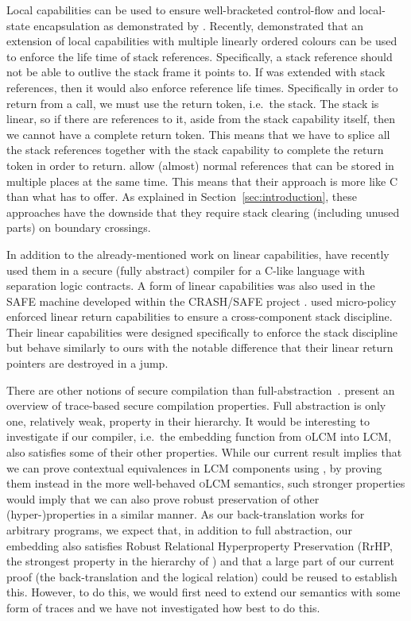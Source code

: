 \documentclass[acmsmall,screen]{acmart}\settopmatter{}
\newcommand{\trgcm}{\textsc{LCM}}
\newcommand{\srccm}{\textsc{oLCM}}
\begin{document}
Local capabilities can be used to ensure well-bracketed control-flow and local-state encapsulation as demonstrated by \citet{skorstengaard_reasoning_2017}.
Recently, \citet{tsampas_2019} demonstrated that an extension of local capabilities with multiple linearly ordered colours can be used to enforce the life time of stack references.
Specifically, a stack reference should not be able to outlive the stack frame it points to.
If \stktokens{} was extended with stack references, then it would also enforce reference life times.
Specifically in order to return from a call, we must use the return token, i.e.\ the stack.
The stack is linear, so if there are references to it, aside from the stack capability itself, then we cannot have a complete return token.
This means that we have to splice all the stack references together with the stack capability to complete the return token in order to return.
\citet{tsampas_2019} allow (almost) normal references that can be stored in multiple places at the same time.
This means that their approach is more like C than what \stktokens{} has to offer.
As explained in Section~\ref{sec:introduction}, these approaches have the downside that they require stack clearing (including unused parts) on boundary crossings.

In addition to the already-mentioned work on linear capabilities, \citet{van_strydonck_linear_2019} have recently used them in a secure (fully abstract) compiler for a C-like language with separation logic contracts.
A form of linear capabilities was also used in the SAFE machine developed within the CRASH/SAFE project \citep{DBLP:conf/sp/AmorimDGHPST15,DBLP:journals/jcs/AmorimCDDHPPPT16}.
\citet{Abate:2018:GCG:3243734.3243745} used micro-policy enforced linear return capabilities to ensure a cross-component stack discipline.
Their linear capabilities were designed specifically to enforce the stack discipline but behave similarly to ours with the notable difference that their linear return pointers are destroyed in a jump.

There are other notions of secure compilation than full-abstraction~\citep{abadi_protection_1998}.
\citet{abate_2019} present an overview of trace-based secure compilation properties.
Full abstraction is only one, relatively weak, property in their hierarchy.
It would be interesting to investigate if our compiler, i.e.\ the embedding function from \srccm{} into \trgcm{}, also satisfies some of their other properties.
While our current result implies that we can prove contextual equivalences in \trgcm{} components using \stktokens{}, by proving them instead in the more well-behaved \srccm{} semantics, such stronger properties would imply that we can also prove robust preservation of other (hyper-)properties in a similar manner.
As our back-translation works for arbitrary programs, we expect that, in addition to full abstraction, our embedding also satisfies Robust Relational Hyperproperty Preservation (RrHP, the strongest property in the hierarchy of \citeauthor{abate_2019}) and that a large part of our current proof (the back-translation and the logical relation) could be reused to establish this.
However, to do this, we would first need to extend our semantics with some form of traces and we have not investigated how best to do this. 
\end{document}
